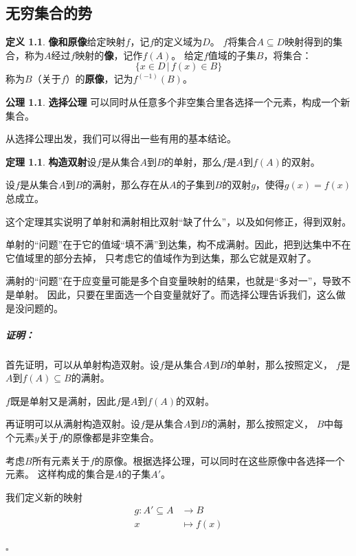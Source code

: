 \documentclass[12pt,UTF8]{ctexbook}
\theoremstyle{definition}
\newtheorem{df}{定义}[section]
\newtheorem*{po}{公理}
\newtheorem{tm}{定理}[section]
\theoremstyle{plain}
\renewenvironment{proof}{\paragraph{\textbf{证明：}}}{\hfill$\square$}
\begin{document}
\begin{appendix}

\chapter{无穷集合的势}

\begin{df}{\textbf{像和原像}}\label{df:a-1-0}
    给定映射$f$，记$f$的定义域为$D$。
    $f$将集合$A\subseteq D$映射得到的集合，称为$A$经过$f$映射的\textbf{像}，记作$f(A)$。
    给定$f$值域的子集$B$，将集合：
    $$ \{x \in D \, | \, f(x) \in B \}$$
    称为$B$（关于$f$）的\textbf{原像}，记为$f^{(-1)}(B)$。
\end{df}

\begin{po}{\textbf{选择公理}}
    可以同时从任意多个非空集合里各选择一个元素，构成一个新集合。
\end{po}

从选择公理出发，我们可以得出一些有用的基本结论。

\begin{tm}{\textbf{构造双射}}\label{tm:a-1-0}
    设$f$是从集合$A$到$B$的单射，那么$f$是$A$到$f(A)$的双射。

    设$f$是从集合$A$到$B$的满射，那么存在从$A$的子集到$B$的双射$g$，使得$g(x) = f(x)$总成立。
\end{tm}

这个定理其实说明了单射和满射相比双射“缺了什么”，以及如何修正，得到双射。

单射的“问题”在于它的值域“填不满”到达集，构不成满射。因此，把到达集中不在它值域里的部分去掉，
只考虑它的值域作为到达集，那么它就是双射了。

满射的“问题”在于应变量可能是多个自变量映射的结果，也就是“多对一”，导致不是单射。
因此，只要在里面选一个自变量就好了。而选择公理告诉我们，这么做是没问题的。

\begin{proof}
    首先证明，可以从单射构造双射。设$f$是从集合$A$到$B$的单射，那么按照定义，
    $f$是$A$到$f(A)\subseteq B$的满射。

    $f$既是单射又是满射，因此$f$是$A$到$f(A)$的双射。

    再证明可以从满射构造双射。设$f$是从集合$A$到$B$的满射，那么按照定义，
    $B$中每个元素$y$关于$f$的原像都是非空集合。

    考虑$B$所有元素关于$f$的原像。根据选择公理，可以同时在这些原像中各选择一个元素。
    这样构成的集合是$A$的子集$A'$。

    我们定义新的映射
    \begin{align*}
        g: A'\subseteq A &\rightarrow B \\
        x &\mapsto f(x)
    \end{align*}
    

\end{proof}
\end{appendix}
\end{document}
